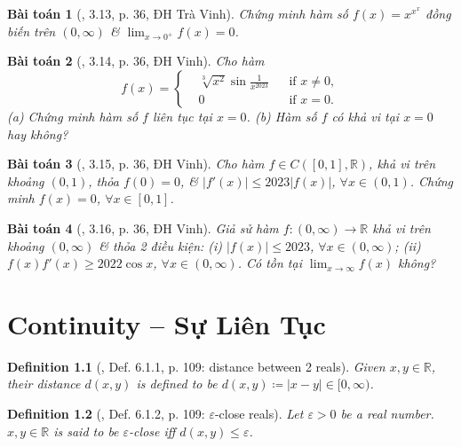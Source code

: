 \documentclass[oneside]{book}
\newtheorem{baitoan}{Bài toán}
\newtheorem{definition}{Definition}
\begin{document}
\begin{baitoan}[\cite{VMS_VMC2023}, 3.13, p. 36, ĐH Trà Vinh]
	Chứng minh hàm số $f(x) = x^{x^x}$ đồng biến trên $(0,\infty)$ \& $\lim_{x\to0^+} f(x) = 0$.
\end{baitoan}

\begin{baitoan}[\cite{VMS_VMC2023}, 3.14, p. 36, ĐH Vinh]
	Cho hàm
	\begin{equation*}
		f(x) = \left\{\begin{split}
			&\sqrt[3]{x^2}\sin\frac{1}{x^{2023}}&&\mbox{if } x\ne0,\\
			&0&&\mbox{if } x = 0.
		\end{split}\right.
	\end{equation*}
	(a) Chứng minh hàm số $f$ liên tục tại $x = 0$. (b) Hàm số $f$ có khả vi tại $x = 0$ hay không?
\end{baitoan}

\begin{baitoan}[\cite{VMS_VMC2023}, 3.15, p. 36, ĐH Vinh]
	Cho hàm $f\in C([0,1],\mathbb{R})$, khả vi trên khoảng $(0,1)$, thỏa $f(0) = 0$, \& $|f'(x)|\le2023|f(x)|$, $\forall x\in(0,1)$. Chứng minh $f(x) = 0$, $\forall x\in[0,1]$.
\end{baitoan}

\begin{baitoan}[\cite{VMS_VMC2023}, 3.16, p. 36, ĐH Vinh]
	Giả sử hàm $f:(0,\infty)\to\mathbb{R}$ khả vi trên khoảng $(0,\infty)$ \& thỏa 2 điều kiện: (i) $|f(x)|\le2023$, $\forall x\in(0,\infty)$; (ii) $f(x)f'(x)\ge2022\cos x$, $\forall x\in(0,\infty)$. Có tồn tại $\lim_{x\to\infty} f(x)$ không?
\end{baitoan}


\chapter{Continuity -- Sự Liên Tục}
\minitoc

\begin{definition}[\cite{Tao_analysis_1}, Def. 6.1.1, p. 109: distance between 2 reals]
	Given $x,y\in\mathbb{R}$, their distance $d(x,y)$ is defined to be $d(x,y)\coloneqq|x - y|\in[0,\infty)$.
\end{definition}

\begin{definition}[\cite{Tao_analysis_1}, Def. 6.1.2, p. 109: $\varepsilon$-close reals]
	Let $\varepsilon > 0$ be a real number. $x,y\in\mathbb{R}$ is said to be {\rm$\varepsilon$-close} iff $d(x,y)\le\varepsilon$.
\end{definition}
\end{document}
